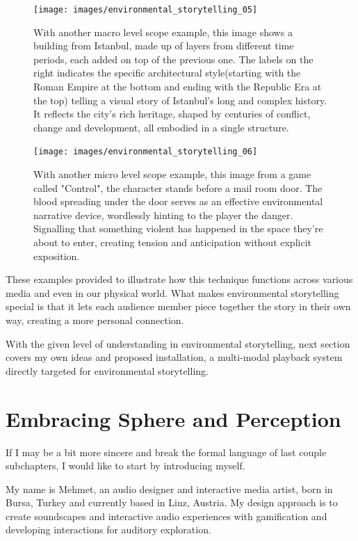     \begin{figure}[H]
    \centering
    \texttt{[image: images/environmental\_storytelling\_05]}
    \caption{With another macro level scope example, this image shows a building from Istanbul, made up of layers from different time periods, each added on top of the previous one. The labels on the right indicates the specific architectural style(starting with the Roman Empire at the bottom and ending with the Republic Era at the top) telling a visual story of Istanbul’s long and complex history. It reflects the city’s rich heritage, shaped by centuries of conflict, change and development, all embodied in a single structure.}
    \end{figure}

    \begin{figure}[H]
    \centering
    \texttt{[image: images/environmental\_storytelling\_06]}
    \caption{With another micro level scope example, this image from a game called "Control", the character stands before a mail room door. The blood spreading under the door serves as an effective environmental narrative device, wordlessly hinting to the player the danger. Signalling that something violent has happened in the space they're about to enter, creating tension and anticipation without explicit exposition.}
    \end{figure}

    These examples provided to illustrate how this technique functions across various media and even in our physical world. What makes environmental storytelling special is that it lets each audience member piece together the story in their own way, creating a more personal connection.\par

    With the given level of understanding in environmental storytelling, next section covers my own ideas and proposed installation, a multi-modal playback system directly targeted for environmental storytelling.\par
    \section{Embracing Sphere and Perception} 
    If I may be a bit more sincere and break the formal language of last couple subchapters, I would like to start by introducing myself.\par 
    
    My name is Mehmet, an audio designer and interactive media artist, born in Bursa, Turkey and currently based in Linz, Austria. My design approach is to create soundscapes and interactive audio experiences with gamification and developing interactions for auditory exploration.\par

